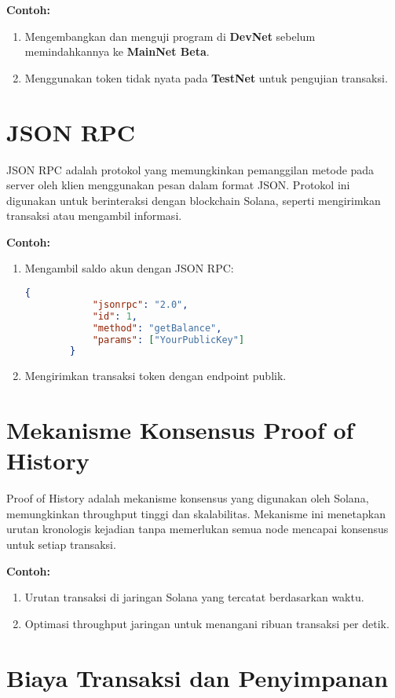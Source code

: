 \textbf{Contoh:}
\begin{enumerate}
	\item Mengembangkan dan menguji program di \textbf{DevNet} sebelum memindahkannya ke \textbf{MainNet Beta}.
	\item Menggunakan token tidak nyata pada \textbf{TestNet} untuk pengujian transaksi.
\end{enumerate}

\section{JSON RPC}

JSON RPC adalah protokol yang memungkinkan pemanggilan metode pada server oleh klien menggunakan pesan dalam format JSON. Protokol ini digunakan untuk berinteraksi dengan blockchain Solana, seperti mengirimkan transaksi atau mengambil informasi.

\textbf{Contoh:}
\begin{enumerate}
	\item Mengambil saldo akun dengan JSON RPC:
	\begin{lstlisting}[language=json]
		{
			"jsonrpc": "2.0",
			"id": 1,
			"method": "getBalance",
			"params": ["YourPublicKey"]
		}
	\end{lstlisting}
	\item Mengirimkan transaksi token dengan endpoint publik.
\end{enumerate}

\section{Mekanisme Konsensus Proof of History}

Proof of History adalah mekanisme konsensus yang digunakan oleh Solana, memungkinkan throughput tinggi dan skalabilitas. Mekanisme ini menetapkan urutan kronologis kejadian tanpa memerlukan semua node mencapai konsensus untuk setiap transaksi.

\textbf{Contoh:}
\begin{enumerate}
	\item Urutan transaksi di jaringan Solana yang tercatat berdasarkan waktu.
	\item Optimasi throughput jaringan untuk menangani ribuan transaksi per detik.
\end{enumerate}

\section{Biaya Transaksi dan Penyimpanan}


